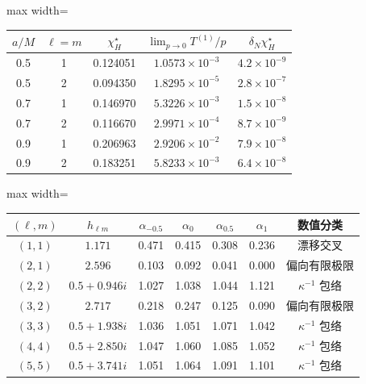 \documentclass[UTF8,fontset=fandol,11pt,a4paper]{ctexart}
\begin{document}
\par\addvspace{12pt}\noindent\begin{minipage}{\linewidth}
\centering\fontsize{9.5}{12}\selectfont\setlength{\tabcolsep}{3pt}\renewcommand{\arraystretch}{1.18}
\label{audit:tab:superradiant}
\begin{adjustbox}{max width=\linewidth}
\begin{tabular}{c c c c c}
\toprule
$a/M$ & $\ell=m$ & $\chi_H^\star$ & $\displaystyle\lim_{p\to0}T^{(1)}/p$ & $\delta_N\chi_H^\star$\\
\midrule
0.5 & 1 & 0.124051 & $1.0573\times10^{-3}$ & $4.2\times10^{-9}$\\
0.5 & 2 & 0.094350 & $1.8295\times10^{-5}$ & $2.8\times10^{-7}$\\
0.7 & 1 & 0.146970 & $5.3226\times10^{-3}$ & $1.5\times10^{-8}$\\
0.7 & 2 & 0.116670 & $2.9971\times10^{-4}$ & $8.7\times10^{-9}$\\
0.9 & 1 & 0.206963 & $2.9206\times10^{-2}$ & $7.9\times10^{-8}$\\
0.9 & 2 & 0.183251 & $5.8233\times10^{-3}$ & $6.4\times10^{-8}$\\
\bottomrule\end{tabular}\end{adjustbox}
\end{minipage}\par\addvspace{9pt}


\par\addvspace{12pt}\noindent\begin{minipage}{\linewidth}
\centering\fontsize{9.5}{12}\selectfont\setlength{\tabcolsep}{3pt}\renewcommand{\arraystretch}{1.18}
\label{audit:tab:near-extremal-threshold}
\begin{adjustbox}{max width=\linewidth}
\begin{tabular}{c c c c c c c}
\toprule
$(\ell,m)$ & $h_{\ell m}$ & $\alpha_{-0.5}$ & $\alpha_{0}$
& $\alpha_{0.5}$ & $\alpha_{1}$ & 数值分类\\
\midrule
$(1,1)$ & $1.171$ & 0.471 & 0.415 & 0.308 & 0.236 & 漂移交叉\\
$(2,1)$ & $2.596$ & 0.103 & 0.092 & 0.041 & 0.000 & 偏向有限极限\\
$(2,2)$ & $0.5+0.946i$ & 1.027 & 1.038 & 1.044 & 1.121 & $\kappa^{-1}$ 包络\\
$(3,2)$ & $2.717$ & 0.218 & 0.247 & 0.125 & 0.090 & 偏向有限极限\\
$(3,3)$ & $0.5+1.938i$ & 1.036 & 1.051 & 1.071 & 1.042 & $\kappa^{-1}$ 包络\\
$(4,4)$ & $0.5+2.850i$ & 1.047 & 1.060 & 1.085 & 1.052 & $\kappa^{-1}$ 包络\\
$(5,5)$ & $0.5+3.741i$ & 1.051 & 1.064 & 1.091 & 1.101 & $\kappa^{-1}$ 包络\\
\bottomrule\end{tabular}\end{adjustbox}
\end{minipage}\par\addvspace{9pt}
\end{document}
